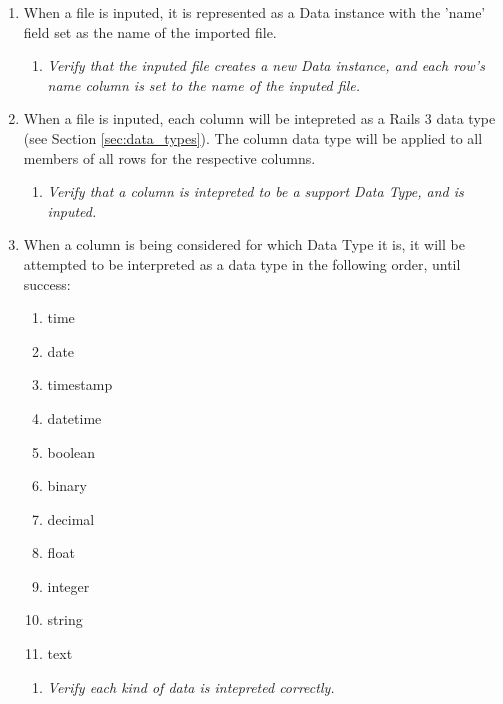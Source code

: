 \begin{enumerate}
		\item When a file is inputed, it is represented as a Data 
			instance with the 'name' field set as the name of the
			imported file.
		\begin{enumerate}
			\item \textit{ Verify that the inputed file creates 
					a new Data instance, and each row's
					name column is set to the name of the
					inputed file.}
		\end{enumerate}

		\item When a file is inputed, each column will be intepreted
			as a Rails 3 data type (see Section
			\ref{sec:data_types}). The column data type will be 
			applied to all members of all rows for the respective
			columns.
		\begin{enumerate}
			\item \textit{ Verify that a column is intepreted to
					be a support Data Type, and is inputed.}
		\end{enumerate}

		\item When a column is being considered for which Data Type
			it is, it will be attempted to be interpreted as a 
			data type in the following order, until success:
			\begin{enumerate}
				\item time
				\item date
				\item timestamp
				\item datetime
				\item boolean
				\item binary
				\item decimal
				\item float
				\item integer
				\item string
				\item text
			\end{enumerate}

		\begin{enumerate}
			\item \textit{ Verify each kind of data is intepreted
					correctly.}
		\end{enumerate}

	\end{enumerate}


